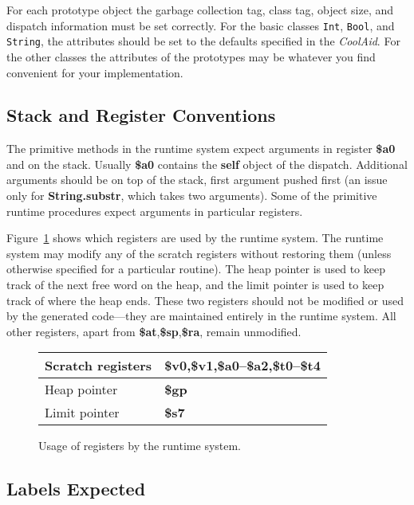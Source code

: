 \documentclass[11pt]{article}
\def\C#1{{\bf{}#1}}
\begin{document}
For each prototype object the garbage collection tag, class tag,
object size, and dispatch information must be set correctly.  For the
basic classes {\tt Int}, {\tt Bool}, and {\tt String}, the attributes
should be set to the defaults specified in the {\em CoolAid}.  For the other
classes the attributes of the prototypes may be whatever you find
convenient for your implementation.

\subsection{Stack and Register Conventions}

The primitive methods in the runtime system expect arguments in register
\C{\$a0} and on the stack. Usually \C{\$a0} contains the \C{self} object
of the dispatch. Additional arguments should be on top of the stack, first
argument pushed first (an issue only for \C{String.substr}, which takes
two arguments). Some of the primitive runtime procedures expect
arguments in particular registers.

Figure~\ref{fig1} shows which registers are used by the runtime system. The
runtime system may modify any of the scratch registers without restoring them
(unless otherwise specified for a particular routine). The heap
pointer is used to keep track of the next free word on the heap, and
the limit pointer is used to keep track of where the heap ends. These
two registers should not be modified or used by the generated
code---they are maintained entirely in the runtime system. All other registers,
apart from \C{\$at},\C{\$sp},\C{\$ra}, remain unmodified.

\begin{figure}
\begin{center}
\begin{tabular}{|l|l|}
\hline
Scratch registers & \C{\$v0},\C{\$v1},\C{\$a0}--\C{\$a2},\C{\$t0}--\C{\$t4}\\
\hline
Heap pointer   & \C{\$gp} \\
\hline
Limit pointer & \C{\$s7}\\
\hline
\end{tabular}
\end{center}
\caption{Usage of registers by the runtime system.}
\label{fig1}
\end{figure}
\subsection{Labels Expected}
\end{document}
